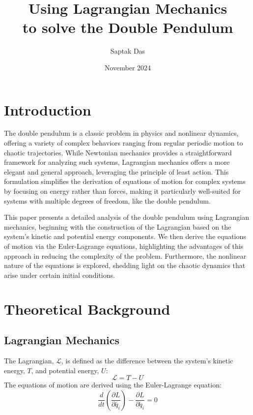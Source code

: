 \documentclass[12pt]{article}
\title{Using Lagrangian Mechanics\\ to solve the Double Pendulum}
\author{Saptak Das}
\date{November 2024}
\newcommand{\Lagr}{\mathcal{L}}
\begin{document}
\maketitle

\section{Introduction}
The double pendulum is a classic problem in physics and nonlinear dynamics, offering a variety of complex behaviors ranging from regular periodic motion to chaotic trajectories. While Newtonian mechanics provides a straightforward framework for analyzing such systems, Lagrangian mechanics offers a more elegant and general approach, leveraging the principle of least action. This formulation simplifies the derivation of equations of motion for complex systems by focusing on energy rather than forces, making it particularly well-suited for systems with multiple degrees of freedom, like the double pendulum.

This paper presents a detailed analysis of the double pendulum using Lagrangian mechanics, beginning with the construction of the Lagrangian based on the system's kinetic and potential energy components. We then derive the equations of motion via the Euler-Lagrange equations, highlighting the advantages of this approach in reducing the complexity of the problem. Furthermore, the nonlinear nature of the equations is explored, shedding light on the chaotic dynamics that arise under certain initial conditions.

\section{Theoretical Background}
\subsection{Lagrangian Mechanics}
\noindent
The Lagrangian, \(\Lagr\), is defined as the difference between the system's kinetic energy, \(T\), and potential energy, \(U\):
\begin{equation}
    \Lagr = T - U
\end{equation}
\noindent
The equations of motion are derived using the Euler-Lagrange equation:
\begin{equation}
    \frac{d}{dt} \left( \frac{\partial L}{\partial \dot{q_i}}  \right) - \frac{\partial L}{\partial q_i} = 0
\end{equation}
\end{document}
